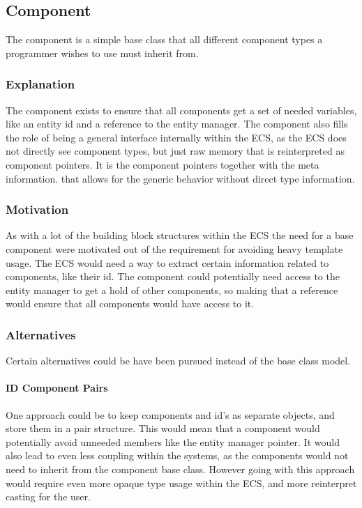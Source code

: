 \subsection{Component}
\label{subsec:detailed_component}
The component is a simple base class that all
different component types a programmer wishes to use must inherit from.

\subsubsection{Explanation}
The component exists to ensure that all components get a set of needed
variables, like an entity id and a reference to the entity manager.
The component also fills the role of being a general interface
internally within the ECS, as the ECS does not directly see component types,
but just raw memory that is reinterpreted as component pointers.
It is the component pointers together with the meta information.
that allows for the generic behavior without direct type information.

\subsubsection{Motivation}
As with a lot of the building block structures within the ECS the need for a base component
were motivated out of the requirement for avoiding heavy template usage.
The ECS would need a way to extract certain information related to components,
like their id. The component could potentially need access to the entity manager
to get a hold of other components, so making that a reference
would ensure that all components would have access to it.

\subsubsection{Alternatives}
Certain alternatives could be have been pursued instead of the base class model.

\paragraph{ID Component Pairs}
One approach could be to keep components and id's as separate objects, and store them in a pair structure.
This would mean that a component would potentially avoid unneeded members like the entity manager pointer.
It would also lead to even less coupling within the systems,
as the components would not need to inherit from the component base class.
However going with this approach would require even more opaque type usage within the ECS,
and more reinterpret casting for the user.

